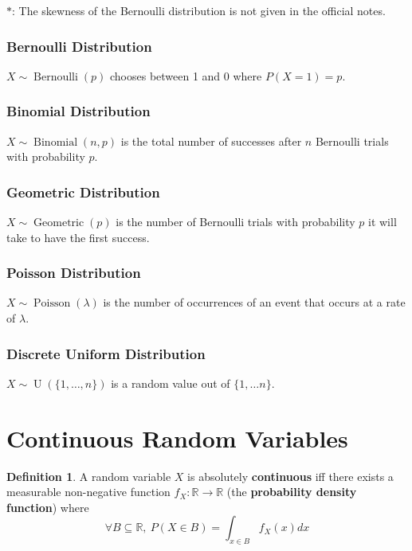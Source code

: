 \documentclass[12pt]{article}
\theoremstyle{definition}
\newtheorem{defn}{Definition}[subsection]
\newcommand{\R}{\mathbb{R}}
\DeclareMathOperator{\Bernoulli}{Bernoulli}
\DeclareMathOperator{\Binomial}{Binomial}
\DeclareMathOperator{\Geometric}{Geometric}
\DeclareMathOperator{\Poisson}{Poisson}
\DeclareMathOperator{\U}{U}
\begin{document}
$\ast$: The skewness of the Bernoulli distribution is not given in the official notes.

\subsubsection{Bernoulli Distribution}

$X \sim \Bernoulli(p)$ chooses between 1 and 0 where $P(X = 1) = p$.

\subsubsection{Binomial Distribution}

$X \sim \Binomial(n, p)$ is the total number of successes after $n$ Bernoulli trials with probability $p$.

\subsubsection{Geometric Distribution}

$X \sim \Geometric(p)$ is the number of Bernoulli trials with probability $p$ it will take to have the first success.

\subsubsection{Poisson Distribution}

$X \sim \Poisson(\lambda)$ is the number of occurrences of an event that occurs at a rate of $\lambda$.

\subsubsection{Discrete Uniform Distribution}

$X \sim \U(\{1, \ldots, n\})$ is a random value out of $\{1, \ldots n\}$.

\section{Continuous Random Variables}

\begin{defn}
  A random variable $X$ is absolutely \textbf{continuous} iff there exists a measurable non-negative function $f_X : \R \to \R$ (the \textbf{probability density function}) where
  $$\forall B \subseteq \R,\ P(X \in B) = \int_{x \in B}f_X(x)dx$$
\end{defn}
\end{document}
